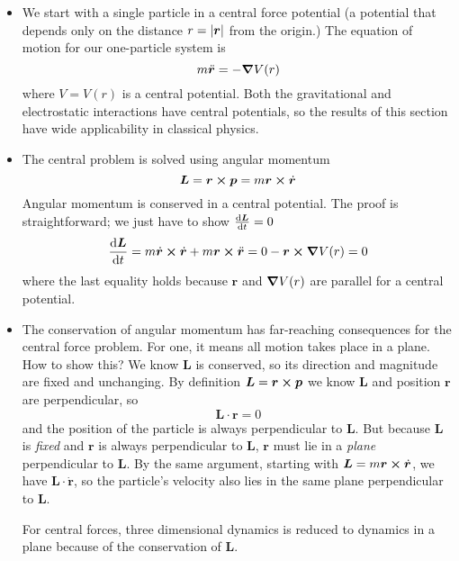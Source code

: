 \documentclass[11pt, a4paper]{article}
\newcommand{\bdot}[1]{\dot{\bm{#1}}} %
\newcommand{\bddot}[1]{\ddot{\bm{#1}}} %
\begin{document}
\begin{itemize}
	\item We start with a single particle in a central force potential (a potential that depends only on the distance $ r = \abs{\bm{r}} $ from the origin.) The equation of motion for our one-particle system is
	\begin{equation*}
		m \ddot{\bm{r}} = - \grad V(r)
	\end{equation*}
	where $ V = V(r) $ is a central potential. Both the gravitational and electrostatic interactions have central potentials, so the results of this section have wide applicability in classical physics.
	
	\item The central problem is solved using angular momentum
	\begin{equation*}
		\bm{L} = \bm{r} \cross \bm{p} = m \bm{r} \cross \bdot{r}
	\end{equation*}
	Angular momentum is conserved in a central potential. The proof is straightforward; we just have to show $ \dv{\bm{L}}{t} = 0 $
	\begin{equation*}
		\dv{\bm{L}}{t} = m \bdot{r} \cross \bdot{r} + m \bm{r} \cross \bddot{r} = 0 - \bm{r} \cross \grad{V}(r) = 0
	\end{equation*}
	where the last equality holds because $ \bm{r} $ and $ \grad{V}(r) $ are parallel for a central potential.
	
	\item The conservation of angular momentum has far-reaching consequences for the central force problem. For one, it means all motion takes place in a plane. How to show this? We know $ \bm{L} $ is conserved, so its direction and magnitude are fixed and unchanging. By definition $ \bm{L} = \bm{r} \cross \bm{p}$ we know $ \bm{L} $ and position $ \bm{r} $ are perpendicular, so 
	\begin{equation*}
		\bm{L} \cdot \bm{r} = 0
	\end{equation*}
	and the position of the particle is always perpendicular to $ \bm{L} $. But because $ \bm{L} $ is \textit{fixed} and $ \bm{r} $ is always perpendicular to $ \bm{L} $, $ \bm{r} $ must lie in a \textit{plane} perpendicular to $ \bm{L} $.	By the same argument, starting with $ \bm{L} = m \bm{r} \cross \bdot{r} $, we have $ \bm{L} \cdot \bdot{r} $, so the particle's velocity also lies in the same plane perpendicular to $ \bm{L} $.
	
	For central forces, three dimensional dynamics is reduced to dynamics in a plane because of the conservation of $ \bm{L} $.
	
\end{itemize}
\end{document}
